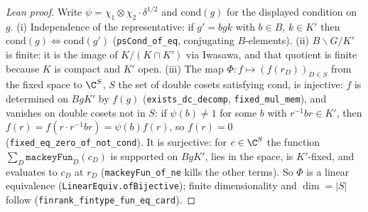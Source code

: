 \begin{proof}[Lean proof]
Write $\psi=\chi_1\otimes\chi_2\cdot\delta^{1/2}$ and $\mathrm{cond}(g)$ for the displayed condition on $g$. (i) Independence of the representative: if $g'=bgk$ with $b\in B$, $k\in K'$ then $\mathrm{cond}(g)\Leftrightarrow\mathrm{cond}(g')$ (\texttt{psCond\_of\_eq}, conjugating $B$-elements). (ii) $B\backslash G/K'$ is finite: it is the image of $K/(K\cap K')$ via Iwasawa, and that quotient is finite because $K$ is compact and $K'$ open. (iii) The map $\Phi\colon f\mapsto (f(r_D))_{D\in S}$ from the fixed space to $\C^S$, $S$ the set of double cosets satisfying $\mathrm{cond}$, is injective: $f$ is determined on $BgK'$ by $f(g)$ (\texttt{exists\_dc\_decomp}, \texttt{fixed\_mul\_mem}), and vanishes on double cosets not in $S$: if $\psi(b)\ne1$ for some $b$ with $r^{-1}br\in K'$, then $f(r)=f(r\cdot r^{-1}br)=\psi(b)f(r)$, so $f(r)=0$ (\texttt{fixed\_eq\_zero\_of\_not\_cond}). It is surjective: for $c\in\C^S$ the function $\sum_D\texttt{mackeyFun}_D(c_D)$ is supported on $BgK'$, lies in the space, is $K'$-fixed, and evaluates to $c_D$ at $r_D$ (\texttt{mackeyFun\_of\_ne} kills the other terms). So $\Phi$ is a linear equivalence (\texttt{LinearEquiv.ofBijective}); finite dimensionality and $\dim=|S|$ follow (\texttt{finrank\_fintype\_fun\_eq\_card}).
\end{proof}


